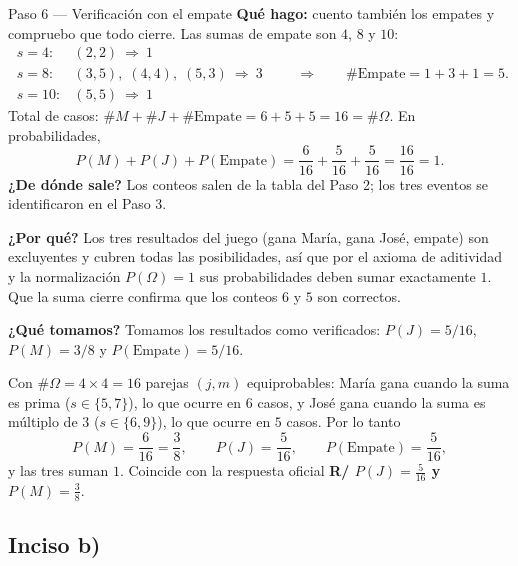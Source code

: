 \documentclass[11pt]{article}
\begin{document}
\begin{sol}
\begin{paso}{Paso 6 --- Verificación con el empate}
\textbf{Qué hago:} cuento también los empates y compruebo que todo cierre. Las sumas de empate
son $4$, $8$ y $10$:
\[
\begin{array}{ll}
s=4: & (2,2)\ \Rightarrow\ 1\\
s=8: & (3,5),\;(4,4),\;(5,3)\ \Rightarrow\ 3\\
s=10: & (5,5)\ \Rightarrow\ 1
\end{array}
\qquad\Rightarrow\qquad \#\text{Empate}=1+3+1=5 .
\]
Total de casos: $\#M+\#J+\#\text{Empate}=6+5+5=16=\#\Omega$. En probabilidades,
\[
P(M)+P(J)+P(\text{Empate})=\frac{6}{16}+\frac{5}{16}+\frac{5}{16}=\frac{16}{16}=1 .
\]
\textbf{¿De dónde sale?} Los conteos salen de la tabla del Paso 2; los tres eventos se
identificaron en el Paso 3.

\textbf{¿Por qué?} Los tres resultados del juego (gana María, gana José, empate) son
excluyentes y cubren todas las posibilidades, así que por el axioma de aditividad y la
normalización $P(\Omega)=1$ sus probabilidades deben sumar exactamente $1$. Que la suma cierre
confirma que los conteos $6$ y $5$ son correctos.

\textbf{¿Qué tomamos?} Tomamos los resultados como verificados: $P(J)=5/16$, $P(M)=3/8$ y
$P(\text{Empate})=5/16$.
\end{paso}
\end{sol}

\begin{resp}
Con $\#\Omega=4\times4=16$ parejas $(j,m)$ equiprobables: María gana cuando la suma es prima
($s\in\{5,7\}$), lo que ocurre en $6$ casos, y José gana cuando la suma es múltiplo de $3$
($s\in\{6,9\}$), lo que ocurre en $5$ casos. Por lo tanto
\[
P(M)=\frac{6}{16}=\frac{3}{8},\qquad
P(J)=\frac{5}{16},\qquad
P(\text{Empate})=\frac{5}{16},
\]
y las tres suman $1$. Coincide con la respuesta oficial \textbf{R/ $P(J)=\frac{5}{16}$ y
$P(M)=\frac{3}{8}$}.
\end{resp}

\subsection*{Inciso b)}
\end{document}

